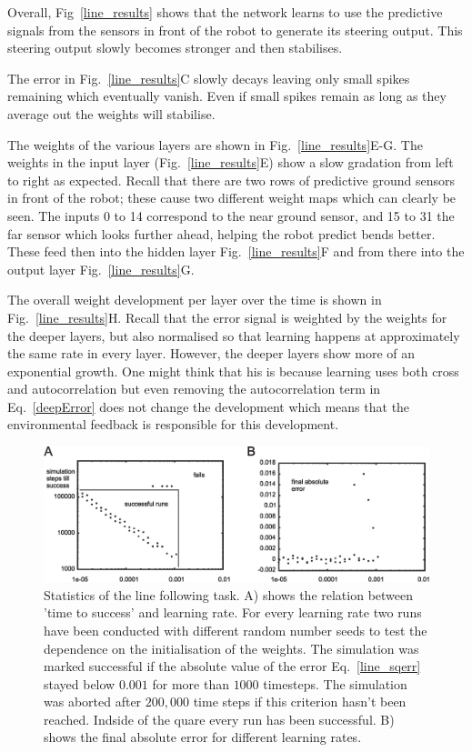 \documentclass{aamas2018}
\begin{document}
Overall, Fig~\ref{line_results} shows that the network learns to use
the predictive signals from the sensors in front of the robot to
generate its steering output. This steering output slowly becomes
stronger and then stabilises.

The error in Fig.~\ref{line_results}C slowly decays
leaving only small spikes remaining which eventually vanish. Even
if small spikes remain as long as they average out the weights
will stabilise.

The weights of the various layers are shown in
Fig.~\ref{line_results}E-G. The weights in the input layer
(Fig.~\ref{line_results}E) show a slow gradation from left to right as
expected. Recall that there are two rows of predictive ground
sensors in front of the robot; these cause two different weight maps
which can clearly be seen. The inputs 0 to 14 correspond to the near
ground sensor, and 15 to 31 the far sensor which looks further ahead, 
helping the robot predict bends better. These feed then into the 
hidden layer Fig.~\ref{line_results}F
and from there into the output layer Fig.~\ref{line_results}G.

The overall weight development per layer over the time is shown in
Fig.~\ref{line_results}H. Recall that the error signal is weighted by
the weights for the deeper layers, but also normalised so that
learning happens at approximately the same rate in every
layer. However, the deeper layers show more of an exponential
growth. One might think that his is because learning uses both
cross and autocorrelation but even removing the autocorrelation
term in Eq.~\ref{deepError} does not change the development which means
that the environmental feedback is responsible for this development.


\begin{figure}[!ht]
  \centering
  \includegraphics[width=\columnwidth]{line_stats}
  \caption{Statistics of the line following task. A) shows the relation between
    'time to success' and learning rate. For every learning rate two runs have
    been conducted with different random number seeds to test the dependence on the
    initialisation of the weights. The simulation was marked successful if the
    absolute value of the error Eq.~\ref{line_sqerr} stayed below $0.001$ for more than $1000$
    timesteps. The simulation was aborted after $200,000$ time steps if this criterion
    hasn't been reached. Indside of the quare every run has been successful.
    B) shows the final absolute error for different learning rates.
    \label{line_stats}}
\end{figure}
\end{document}
